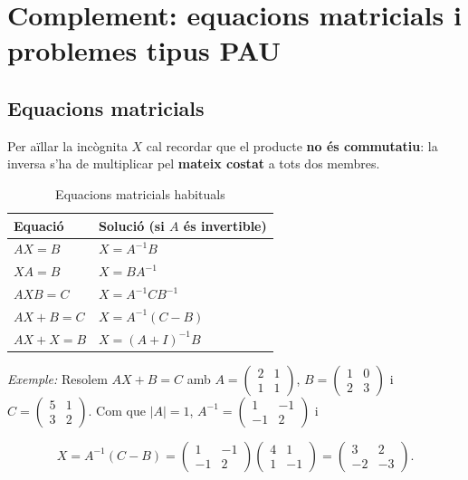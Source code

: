 \section{Complement: equacions matricials i problemes tipus PAU}

\subsection{Equacions matricials}

Per aïllar la incògnita $X$ cal recordar que el producte \textbf{no és commutatiu}: la inversa s'ha de multiplicar pel \textbf{mateix costat} a tots dos membres.

\begin{table}[!htbp]
\centering
\renewcommand{\arraystretch}{1.3}
\begin{tabularx}{\textwidth}{l>{\raggedright\arraybackslash}X}
\toprule
Equació & Solució (si $A$ és invertible) \\
\midrule
$AX=B$ & $X=A^{-1}B$ \\
$XA=B$ & $X=BA^{-1}$ \\
$AXB=C$ & $X=A^{-1}CB^{-1}$ \\
$AX+B=C$ & $X=A^{-1}(C-B)$ \\
$AX+X=B$ & $X=(A+I)^{-1}B$ \\
\bottomrule
\end{tabularx}
\caption{Equacions matricials habituals}
\end{table}

\emph{Exemple:} Resolem $AX+B=C$ amb $A=\begin{pmatrix}2&1\\1&1\end{pmatrix}$, $B=\begin{pmatrix}1&0\\2&3\end{pmatrix}$ i $C=\begin{pmatrix}5&1\\3&2\end{pmatrix}$. Com que $|A|=1$, $A^{-1}=\begin{pmatrix}1&-1\\-1&2\end{pmatrix}$ i

\begin{equation*}
X=A^{-1}(C-B)=\begin{pmatrix}1&-1\\-1&2\end{pmatrix}\begin{pmatrix}4&1\\1&-1\end{pmatrix}=\begin{pmatrix}3&2\\-2&-3\end{pmatrix}.
\end{equation*}

